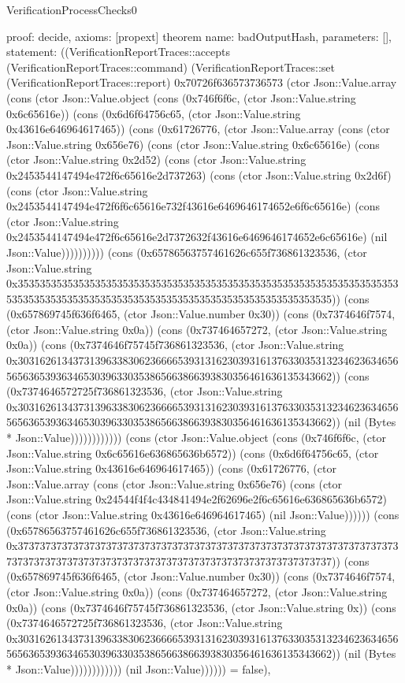 \begin{lexlean}{VerificationProcessChecks0}
\begin{semanticmodule}
{  proof: decide{},
  axioms: [propext]
}
theorem{
  name: badOutputHash,
  parameters: [],
  statement: ((VerificationReportTraces::accepts (VerificationReportTraces::command) (VerificationReportTraces::set (VerificationReportTraces::report) 0x70726f636573736573 (ctor Json::Value.array (cons (ctor Json::Value.object (cons (0x746f6f6c, (ctor Json::Value.string 0x6c65616e)) (cons (0x6d6f64756c65, (ctor Json::Value.string 0x43616e646964617465)) (cons (0x61726776, (ctor Json::Value.array (cons (ctor Json::Value.string 0x656e76) (cons (ctor Json::Value.string 0x6c65616e) (cons (ctor Json::Value.string 0x2d52) (cons (ctor Json::Value.string 0x2453544147494e472f6c65616e2d737263) (cons (ctor Json::Value.string 0x2d6f) (cons (ctor Json::Value.string 0x2453544147494e472f6f6c65616e732f43616e6469646174652e6f6c65616e) (cons (ctor Json::Value.string 0x2453544147494e472f6c65616e2d7372632f43616e6469646174652e6c65616e) (nil Json::Value)))))))))) (cons (0x65786563757461626c655f736861323536, (ctor Json::Value.string 0x35353535353535353535353535353535353535353535353535353535353535353535353535353535353535353535353535353535353535353535353535353535)) (cons (0x657869745f636f6465, (ctor Json::Value.number 0x30)) (cons (0x7374646f7574, (ctor Json::Value.string 0x0a)) (cons (0x737464657272, (ctor Json::Value.string 0x0a)) (cons (0x7374646f75745f736861323536, (ctor Json::Value.string 0x30316261343731396338306236666539313162303931613763303531323462363465656563653936346530396330353865663866393830356461636135343662)) (cons (0x7374646572725f736861323536, (ctor Json::Value.string 0x30316261343731396338306236666539313162303931613763303531323462363465656563653936346530396330353865663866393830356461636135343662)) (nil (Bytes * Json::Value)))))))))))) (cons (ctor Json::Value.object (cons (0x746f6f6c, (ctor Json::Value.string 0x6c65616e636865636b6572)) (cons (0x6d6f64756c65, (ctor Json::Value.string 0x43616e646964617465)) (cons (0x61726776, (ctor Json::Value.array (cons (ctor Json::Value.string 0x656e76) (cons (ctor Json::Value.string 0x24544f4f4c434841494e2f62696e2f6c65616e636865636b6572) (cons (ctor Json::Value.string 0x43616e646964617465) (nil Json::Value)))))) (cons (0x65786563757461626c655f736861323536, (ctor Json::Value.string 0x37373737373737373737373737373737373737373737373737373737373737373737373737373737373737373737373737373737373737373737373737373737)) (cons (0x657869745f636f6465, (ctor Json::Value.number 0x30)) (cons (0x7374646f7574, (ctor Json::Value.string 0x0a)) (cons (0x737464657272, (ctor Json::Value.string 0x0a)) (cons (0x7374646f75745f736861323536, (ctor Json::Value.string 0x)) (cons (0x7374646572725f736861323536, (ctor Json::Value.string 0x30316261343731396338306236666539313162303931613763303531323462363465656563653936346530396330353865663866393830356461636135343662)) (nil (Bytes * Json::Value)))))))))))) (nil Json::Value)))))) = false),
}
\end{semanticmodule}
\end{lexlean}
